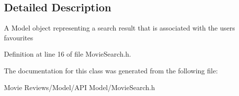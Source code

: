 \subsection{Detailed Description}
A Model object representing a search result that is associated with the user\textquotesingle{}s favourites 

Definition at line 16 of file Movie\+Search.\+h.



The documentation for this class was generated from the following file\+:\begin{DoxyCompactItemize}
\item 
Movie Reviews/\+Model/\+A\+P\+I Model/Movie\+Search.\+h\end{DoxyCompactItemize}
